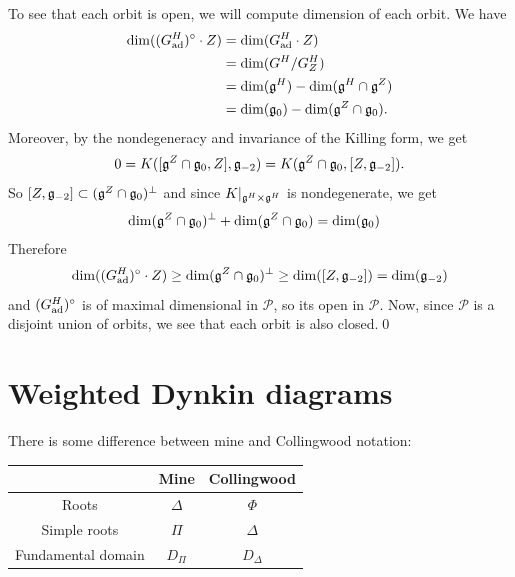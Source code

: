 \begin{itemize}
To see that each orbit is open, we will compute dimension of each orbit. We have 
\begin{equation}
    \begin{split}
      \dim( (G_{\text{ad}}^H)^\circ\cdot Z) &= \dim(G_{\text{ad}}^H\cdot Z)\\
      &=\dim(G^H/G_Z^H)\\
      &=\dim(\mathfrak{g}^H)-\dim(\mathfrak{g}^H\cap\mathfrak{g}^Z)\\
      &=\dim(\mathfrak{g}_0)-\dim(\mathfrak{g}^Z\cap\mathfrak{g}_0).
    \end{split}
\end{equation}
Moreover, by the nondegeneracy and invariance of the Killing form, we get 
\begin{equation}
    0=K([\mathfrak{g}^Z\cap\mathfrak{g}_0,Z],\mathfrak{g}_{-2})=K(\mathfrak{g}^Z\cap\mathfrak{g}_0,[Z,\mathfrak{g}_{-2}]).
\end{equation}
So $[Z,\mathfrak{g}_{-2}]\subset (\mathfrak{g}^Z\cap\mathfrak{g}_0)^\perp$ and since $K|_{\mathfrak{g}^H\times\mathfrak{g}^H}$ is nondegenerate, we get 
\begin{equation}
    \begin{split}
        &\dim(\mathfrak{g}^Z\cap\mathfrak{g}_0)^\perp+\dim(\mathfrak{g}^Z\cap\mathfrak{g}_0)=\dim(\mathfrak{g}_0)
    \end{split}
\end{equation}
Therefore
\begin{equation}
    \dim( (G_{\text{ad}}^H)^\circ\cdot Z)\geq \dim(\mathfrak{g}^Z\cap\mathfrak{g}_0)^\perp\geq\dim([Z,\mathfrak{g}_{-2}])=\dim(\mathfrak{g}_{-2})
\end{equation}
and $(G_{\text{ad}}^H)^\circ$ is of maximal dimensional in $\mathcal{P}$, so its open in $\mathcal{P}$. Now, since 
$\mathcal{P}$ is a disjoint union of orbits, we see that each orbit is also closed.\qed
\end{itemize}

\section{Weighted Dynkin diagrams}
There is some difference between mine and Collingwood notation:
        \begin{center}
            \begin{tabular}{|c|c|c|}
                \hline
              &  Mine & Collingwood \\
                \hline 
        Roots & $\Delta$ & $\Phi$\\
        Simple roots & $\Pi$ & $\Delta$\\
        Fundamental domain & $D_\Pi$ & $D_\Delta$\\
        \hline
            \end{tabular}
        \end{center}


